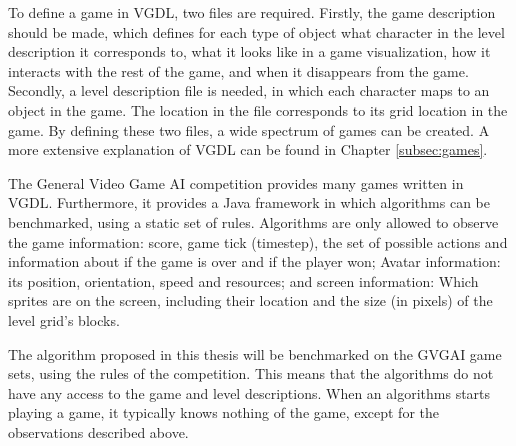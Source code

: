 To define a game in VGDL, two files are required. Firstly, the game description
should be made, which defines for each type of object what character in the
level description it corresponds to, what it looks like in a game visualization,
how it interacts with the rest of the game, and when it disappears from the
game. Secondly, a level description file is needed, in which each character maps
to an object in the game. The location in the file corresponds to its grid
location in the game. By defining these two files, a wide spectrum of games
can be created. A more extensive explanation of VGDL can be found in Chapter
\ref{subsec:games}.

The General Video Game AI competition provides many games written in VGDL.
Furthermore, it provides a Java framework in which algorithms can be
benchmarked, using a static set of rules. Algorithms are only allowed to
observe the game information: score, game tick (timestep), the set of possible
actions and information about if the game is over and if the player won; Avatar
information: its position, orientation, speed and resources; and screen
information: Which sprites are on the screen, including their location and the
size (in pixels) of the level grid's blocks.

The algorithm proposed in this thesis will be benchmarked on the GVGAI game
sets, using the rules of the competition. This means that the algorithms do not
have any access to the game and level descriptions. When an algorithms starts
playing a game, it typically knows nothing of the game, except for the
observations described above.
